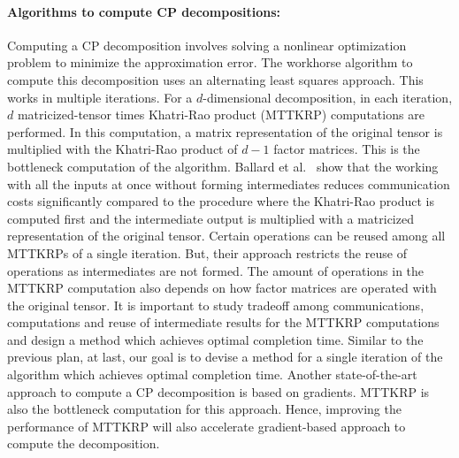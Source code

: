 \documentclass[a4paper,11pt]{article}
\newcommand{\bora}[1]{{\color{magenta} \emph{#1}}}
\renewcommand{\bora}[1]{}
\newcommand{\sk}[1]{{\color{blue} \emph{#1}}}
\renewcommand{\sk}[1]{}
\begin{document}
	
	
	\paragraph{Algorithms to compute CP decompositions:}
	Computing a CP decomposition involves solving a nonlinear optimization problem to minimize the approximation error. The workhorse algorithm to compute this decomposition uses an alternating least squares approach. This works in multiple iterations. For a $d$-dimensional decomposition, in each iteration, $d$ matricized-tensor times Khatri-Rao product (MTTKRP) computations are performed. In this computation, a matrix representation of the original tensor is multiplied with the Khatri-Rao product of $d-1$ factor matrices. This is the bottleneck computation of the algorithm. 
	Ballard et al.~\cite{BNR-IPDPS-2018} show that the working
	with all the inputs at once without forming intermediates reduces communication costs significantly compared to the procedure where the Khatri-Rao product is computed first and the intermediate output is multiplied with a matricized representation of the original tensor. Certain operations can be reused among all MTTKRPs of a single iteration. But, their approach restricts the reuse of operations as intermediates are not formed. The amount of operations in the MTTKRP computation also depends on how factor matrices are operated with the original tensor.
	It is important to study tradeoff among communications, computations and reuse of intermediate results for the MTTKRP computations and design a method which achieves optimal completion time. Similar to the previous plan, at last, our goal is to devise a method for a single iteration of the algorithm which achieves optimal completion time. Another state-of-the-art approach to compute a CP decomposition is based on gradients. MTTKRP is also the bottleneck computation for this approach. Hence, improving the performance of MTTKRP will also accelerate gradient-based approach to compute the decomposition.
	
\end{document}
